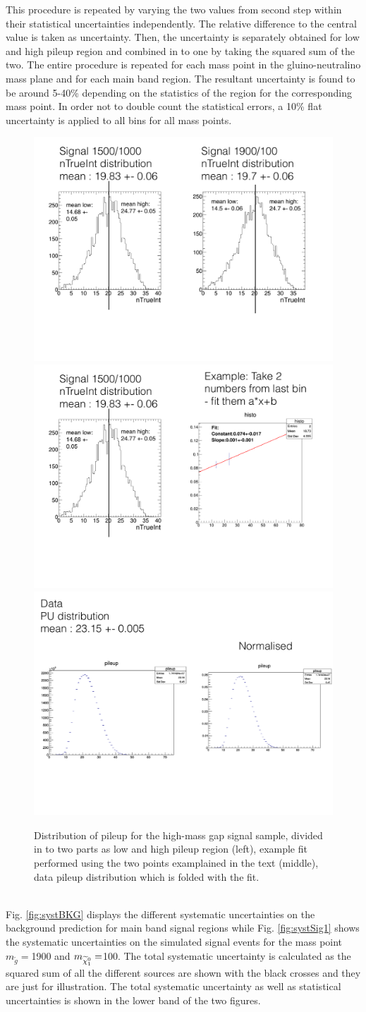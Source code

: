 This procedure is repeated by varying the two values from second step within their statistical uncertainties independently.
The relative difference to the central value is taken as uncertainty.
Then, the uncertainty is separately obtained for low and high pileup region and combined in to one by taking the squared sum of the two. The entire procedure is repeated for each mass point in the gluino-neutralino mass plane and for each main band region. The resultant uncertainty is found to be around 5-40\% depending on the statistics of the region for the corresponding mass point. In order not to double count the statistical errors, a 10\% flat uncertainty is applied to all bins for all mass points.\\
\begin{figure}[!hbt]
    \begin{center}
  \includegraphics[width=0.3 \textwidth]{Plots/analysis/pileUp/lowmassgap_mean_forsyst}
   \includegraphics[width=0.3 \textwidth]{Plots/analysis/pileUp/fit_forsyst}
    \includegraphics[width=0.3 \textwidth]{Plots/analysis/pileUp/datanorm_forsyst}
  \caption{ \label{fig:pileUpsystmech} Distribution of pileup for the high-mass gap signal sample, divided in to two parts as low and high pileup region (left), example fit performed using the two points examplained in the text (middle), data pileup  distribution which is folded with the fit.}
  \end{center}
\end{figure}
\\
Fig. \ref{fig:systBKG} displays the different systematic uncertainties on the background prediction for main band signal regions while Fig. \ref{fig:systSig1} shows the systematic uncertainties on the simulated signal events for the mass point $m_{\tilde{g}}=$1900 and $m_{\widetilde{\chi}^0_1}=$100. The total systematic uncertainty is calculated as the squared sum of all the different sources are shown with the black crosses and they are just for illustration. The total systematic uncertainty as well as statistical uncertainties is shown in the lower band of the two figures.\\
